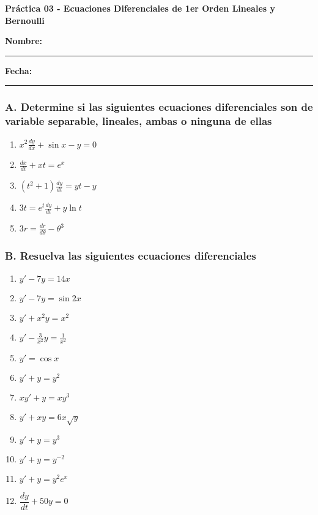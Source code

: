\documentclass[a4paper,12pt]{article}
\begin{document}
\begin{center}
    \Large\textbf{Práctica 03 - Ecuaciones Diferenciales de 1er Orden Lineales y Bernoulli}\\[0.5cm]  

\end{center}
  \textbf{Nombre:} \rule{9cm}{0.4pt}  \textbf{Fecha:} \rule{4.5cm}{0.4pt}


\subsubsection*{A. Determine si las siguientes ecuaciones diferenciales son de variable separable, lineales, ambas o ninguna de ellas}

\begin{enumerate}
    \item \(x^2 \frac{dy}{dx} + \sin x - y = 0\)
    \item \(\frac{dx}{dt} + xt = e^x\)
    \item \((t^2 + 1) \frac{dy}{dt} = yt - y\)
    \item \(3t = e^t \frac{dy}{dt} + y \ln t\)
    \item \(3r = \frac{dr}{d\theta} - \theta^3\)
\end{enumerate}

\subsubsection*{B. Resuelva las siguientes ecuaciones diferenciales}

\begin{enumerate}
    \item $y' - 7y = 14x$
    \item $y' - 7y = \sin 2x$
    \item $y' + x^2 y = x^2$
    \item $y' - \tfrac{3}{x^2}y = \tfrac{1}{x^2}$
    \item $y' = \cos x$
    \item $y' + y = y^2$
    \item $x y' + y = x y^3$
    \item $y' + x y = 6x\sqrt{y}$
    \item $y' + y = y^3$
    \item $y' + y = y^{-2}$
    \item $y' + y = y^2 e^x$
    \item $\dfrac{dy}{dt} + 50y = 0$
\end{enumerate}
\end{document}
